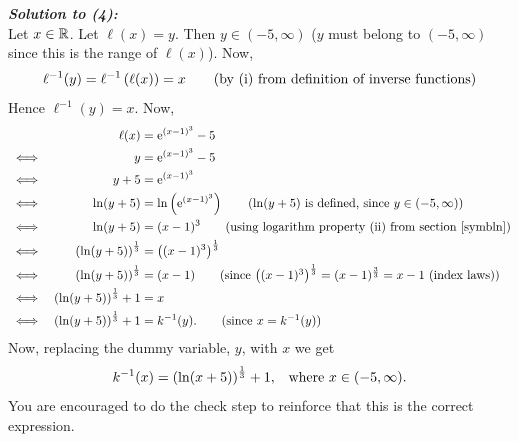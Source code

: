 \bigskip
\noindent \textbf{\textit{Solution to (4):}} \\
Let $x \in \mathbb{R}$. Let $\ell(x) = y$. Then $y \in (-5,\infty)$ ($y$ must belong to $(-5,\infty)$ since this is the range of $\ell(x)$). Now,
\[
\ell^{-1}(y) = \ell^{-1}\left(\ell(x)\right) = x \tag{by (i) from definition of inverse functions}
\]
Hence $\ell^{-1}(y) = x$. Now,
\begin{alignat*}{2}
&& \ell(x) 
& = \e^{(x-1)^3} - 5 \\
& \iff
& y
& = \e^{(x-1)^3} - 5 \\
& \iff
& y + 5
& = \e^{(x-1)^3} \\
& \iff
& \ln(y + 5)
& = \ln\brac{\e^{(x-1)^3}} \tag{$\ln(y + 5)$ is defined, since $y \in (-5,\infty)$} \\
& \iff
& \ln(y + 5)
& = (x-1)^3 \tag{using logarithm property (ii) from section \ref{symbln}} \\
& \iff
& \brac{\ln(y+5)}^\frac{1}{3}
& = \brac{(x-1)^3}^\frac{1}{3} \\
& \iff
& \brac{\ln(y+5)}^\frac{1}{3}
& = (x-1)  \tag{since $\brac{(x-1)^3}^\frac{1}{3} = (x-1)^\frac{3}{3} = x - 1$ (index laws)} \\
& \iff
& \brac{\ln(y+5)}^\frac{1}{3} + 1 
& = x \\
& \iff
& \brac{\ln(y+5)}^\frac{1}{3} + 1
& = k^{-1}(y). \tag{since $x = k^{-1}(y)$}
\end{alignat*}
Now, replacing the dummy variable, $y$, with $x$ we get
\[
 k^{-1}(x) = \left(\ln(x+5)\right)^\frac{1}{3} + 1, \;\;\; \text{where $x \in (-5,\infty).$}
\]
You are encouraged to do the check step to reinforce that this is the correct expression.

